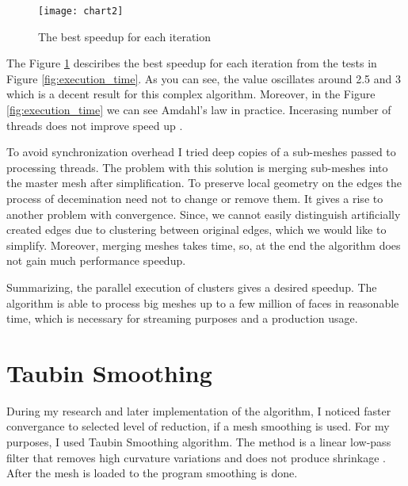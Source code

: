 \begin{figure}[H]
  \begin{center}
    \texttt{[image: chart2]}
    \caption{The best speedup for each iteration}
    \label{fig:speedup}
  \end{center}
\end{figure}

The Figure \ref{fig:speedup} desciribes the best speedup for each iteration from the tests in Figure \ref{fig:execution_time}. As you can see, the value oscillates around 2.5 and 3 which is a decent result for this complex algorithm. Moreover, in the Figure \ref{fig:execution_time} we can see Amdahl's law in practice. Incerasing number of threads does not improve speed up \cite{amdahl67}.

To avoid synchronization overhead I tried deep copies of a sub-meshes passed to processing threads. The problem with this solution is merging sub-meshes into the master mesh after simplification. To preserve local geometry on the edges the process of decemination need not to change or remove them. It gives a rise to another problem with convergence. Since, we cannot easily distinguish artificially created edges due to clustering between original edges, which we would like to simplify. Moreover, merging meshes takes time, so, at the end the algorithm does not gain much performance speedup.

Summarizing, the parallel execution of clusters gives a desired speedup. The algorithm is able to process big meshes up to a few million of faces in reasonable time, which is necessary for streaming purposes and a production usage.

\newpage
\section{Taubin Smoothing}

During my research and later implementation of the algorithm, I noticed faster convergance to selected level of reduction, if a mesh smoothing is used. For my purposes, I used Taubin Smoothing algorithm. The method is a linear low-pass filter that removes high curvature variations and does not produce shrinkage \cite{taubin95}. After the mesh is loaded to the program smoothing is done.

